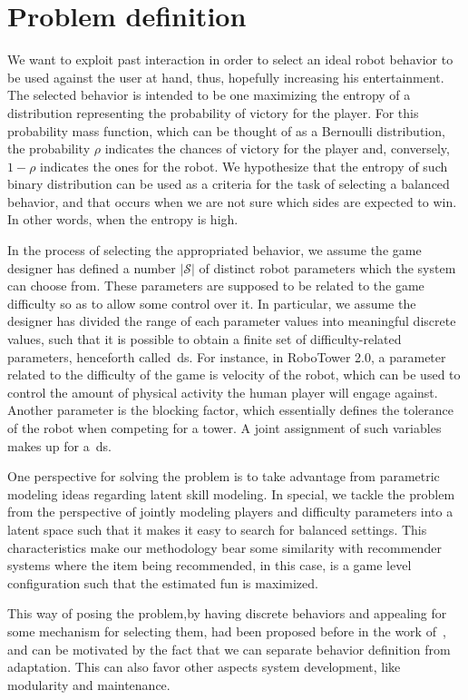 \section{Problem definition}
We want to exploit past interaction in order to select an ideal robot behavior to be used against the user at hand, thus, hopefully increasing his entertainment. The selected behavior is intended to be one maximizing the entropy of a distribution representing the probability of victory for the player. For this probability mass function, which can be thought of as a Bernoulli distribution, the probability $\rho$ indicates the chances of victory for the player and, conversely, $1-\rho$ indicates the ones for the robot. We hypothesize that the entropy of such binary distribution can be used as a criteria for the task of selecting a balanced behavior, and that occurs when we are not sure which sides are expected to win. In other words, when the entropy is high.

In the process of selecting the appropriated behavior, we assume the game designer has defined a number $|\mathcal{S}|$ of distinct robot parameters which the system can choose from. These parameters are supposed to be related to the game difficulty so as to allow some control over it. In particular, we assume the designer has divided the range of each parameter values into meaningful discrete values, such that it is possible to obtain a finite set of difficulty-related parameters, henceforth called~\gls{ds}. For instance, in RoboTower 2.0, a parameter related to the difficulty of the game is velocity of the robot, which can be used to control the amount of physical activity the human player will engage against. Another parameter is the blocking factor, which essentially defines the tolerance of the robot when competing for a tower. A joint assignment of such variables makes up for a~\gls{ds}. 

One perspective for solving the problem is to take advantage from parametric modeling ideas regarding latent skill modeling. In special, we tackle the problem from the perspective of jointly modeling players and difficulty parameters into a latent space such that it makes it easy to search for balanced settings. This characteristics make our methodology bear some similarity with recommender systems where the item being recommended, in this case, is a game level configuration such that the estimated fun is maximized. 

This way of posing the problem,\ie by having discrete behaviors and appealing for some mechanism for selecting them, had been proposed before in the work of~\cite{sejrsgaard-jacobsen_dynamic_2011}, and can be motivated by the fact that we can separate behavior definition from adaptation. This can also favor other aspects system development, like modularity and maintenance.

